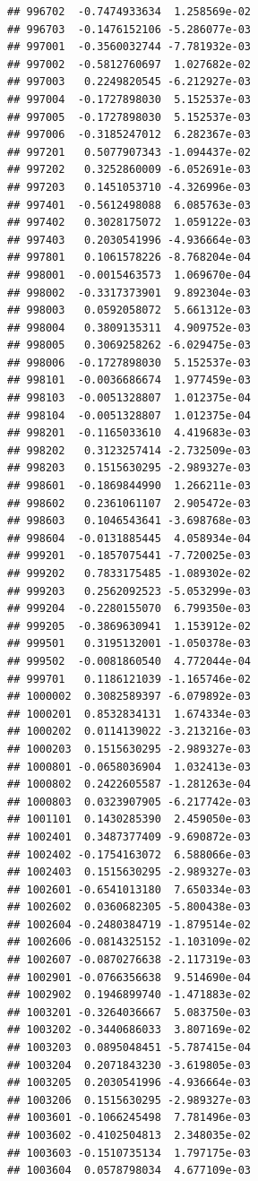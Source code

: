 \documentclass[ignorenonframetext,]{beamer}
\begin{document}
\begin{frame}[fragile]
\begin{verbatim}
## 996702  -0.7474933634  1.258569e-02
## 996703  -0.1476152106 -5.286077e-03
## 997001  -0.3560032744 -7.781932e-03
## 997002  -0.5812760697  1.027682e-02
## 997003   0.2249820545 -6.212927e-03
## 997004  -0.1727898030  5.152537e-03
## 997005  -0.1727898030  5.152537e-03
## 997006  -0.3185247012  6.282367e-03
## 997201   0.5077907343 -1.094437e-02
## 997202   0.3252860009 -6.052691e-03
## 997203   0.1451053710 -4.326996e-03
## 997401  -0.5612498088  6.085763e-03
## 997402   0.3028175072  1.059122e-03
## 997403   0.2030541996 -4.936664e-03
## 997801   0.1061578226 -8.768204e-04
## 998001  -0.0015463573  1.069670e-04
## 998002  -0.3317373901  9.892304e-03
## 998003   0.0592058072  5.661312e-03
## 998004   0.3809135311  4.909752e-03
## 998005   0.3069258262 -6.029475e-03
## 998006  -0.1727898030  5.152537e-03
## 998101  -0.0036686674  1.977459e-03
## 998103  -0.0051328807  1.012375e-04
## 998104  -0.0051328807  1.012375e-04
## 998201  -0.1165033610  4.419683e-03
## 998202   0.3123257414 -2.732509e-03
## 998203   0.1515630295 -2.989327e-03
## 998601  -0.1869844990  1.266211e-03
## 998602   0.2361061107  2.905472e-03
## 998603   0.1046543641 -3.698768e-03
## 998604  -0.0131885445  4.058934e-04
## 999201  -0.1857075441 -7.720025e-03
## 999202   0.7833175485 -1.089302e-02
## 999203   0.2562092523 -5.053299e-03
## 999204  -0.2280155070  6.799350e-03
## 999205  -0.3869630941  1.153912e-02
## 999501   0.3195132001 -1.050378e-03
## 999502  -0.0081860540  4.772044e-04
## 999701   0.1186121039 -1.165746e-02
## 1000002  0.3082589397 -6.079892e-03
## 1000201  0.8532834131  1.674334e-03
## 1000202  0.0114139022 -3.213216e-03
## 1000203  0.1515630295 -2.989327e-03
## 1000801 -0.0658036904  1.032413e-03
## 1000802  0.2422605587 -1.281263e-04
## 1000803  0.0323907905 -6.217742e-03
## 1001101  0.1430285390  2.459050e-03
## 1002401  0.3487377409 -9.690872e-03
## 1002402 -0.1754163072  6.588066e-03
## 1002403  0.1515630295 -2.989327e-03
## 1002601 -0.6541013180  7.650334e-03
## 1002602  0.0360682305 -5.800438e-03
## 1002604 -0.2480384719 -1.879514e-02
## 1002606 -0.0814325152 -1.103109e-02
## 1002607 -0.0870276638 -2.117319e-03
## 1002901 -0.0766356638  9.514690e-04
## 1002902  0.1946899740 -1.471883e-02
## 1003201 -0.3264036667  5.083750e-03
## 1003202 -0.3440686033  3.807169e-02
## 1003203  0.0895048451 -5.787415e-04
## 1003204  0.2071843230 -3.619805e-03
## 1003205  0.2030541996 -4.936664e-03
## 1003206  0.1515630295 -2.989327e-03
## 1003601 -0.1066245498  7.781496e-03
## 1003602 -0.4102504813  2.348035e-02
## 1003603 -0.1510735134  1.797175e-03
## 1003604  0.0578798034  4.677109e-03

\end{verbatim}
\end{frame}
\end{document}
